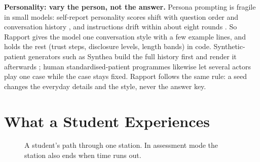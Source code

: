 \documentclass[conference]{IEEEtran}
\begin{document}
\textbf{Personality: vary the person, not the answer.} Persona prompting is fragile in small models: self-report personality scores shift with
question order and conversation history \cite{tosato2025persist}, and instructions drift within about eight rounds \cite{li2024instruction}.
So Rapport gives the model one conversation style with a few example lines, and holds the rest (trust steps, disclosure levels, length bands)
in code. Synthetic-patient generators such as Synthea build the full history first and render it afterwards \cite{walonoski2018synthea}; human
standardised-patient programmes likewise let several actors play one case while the case stays fixed. Rapport follows the same rule: a seed
changes the everyday details and the style, never the answer key.

\section{What a Student Experiences}

\begin{figure}[t]
\centering
{}
\caption{A student's path through one station. In assessment mode the station also ends when time runs out.}
\label{fig:journey}
\end{figure}
\end{document}
